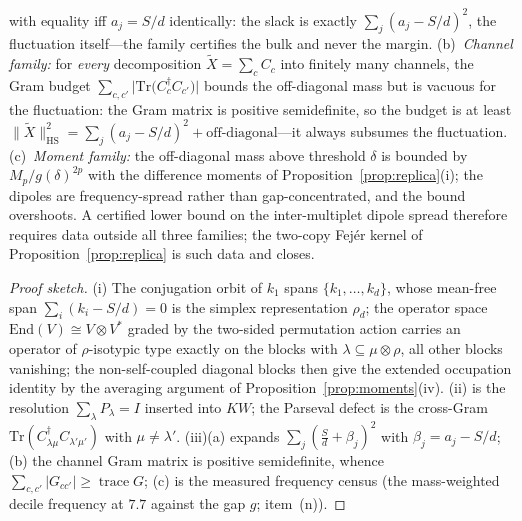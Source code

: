 \begin{proposition}
\begin{enumerate}[leftmargin=1.6em]
with equality iff $a_j=S/d$ identically: the slack is exactly
$\sum_j(a_j-S/d)^{2}$, the fluctuation itself---the family certifies the
bulk and never the margin. (b)~\emph{Channel family:} for
\emph{every} decomposition $\widetilde X=\sum_cC_c$ into finitely many
channels, the Gram budget $\sum_{c,c'}\bigl|
\mathrm{Tr}\bigl(C_c^{\dagger}C_{c'}\bigr)\bigr|$ bounds the off-diagonal
mass but is vacuous for the fluctuation: the Gram matrix is positive
semidefinite, so the budget is at least
$\|\widetilde X\|_{\mathrm{HS}}^{2}
=\sum_j(a_j-S/d)^{2}+\text{off-diagonal}$---it always subsumes the
fluctuation. (c)~\emph{Moment family:} the off-diagonal mass above
threshold $\delta$ is bounded by $M_p/g(\delta)^{2p}$ with the difference
moments of Proposition~\ref{prop:replica}(i); the dipoles are
frequency-spread rather than gap-concentrated, and the bound overshoots.
A certified lower bound on the inter-multiplet dipole spread therefore
requires data outside all three families; the two-copy Fej\'er kernel of
Proposition~\ref{prop:replica} is such data and closes.
\end{enumerate}
\end{proposition}

\begin{proof}[Proof sketch]
(i) The conjugation orbit of $k_1$ spans $\{k_1,\dots,k_d\}$, whose
mean-free span $\sum_i(k_i-S/d)=0$ is the simplex representation
$\rho_d$; the operator space $\mathrm{End}(V)\cong V\otimes V^{*}$ graded
by the two-sided permutation action carries an operator of
$\rho$-isotypic type exactly on the blocks with
$\lambda\subseteq\mu\otimes\rho$, all other blocks vanishing; the
non-self-coupled diagonal blocks then give the extended occupation
identity by the averaging argument of Proposition~\ref{prop:moments}(iv).
(ii) is the resolution $\sum_{\lambda}P_{\lambda}=I$ inserted into
$KW$; the Parseval defect is the cross-Gram
$\mathrm{Tr}(C_{\lambda\mu}^{\dagger}C_{\lambda'\mu'})$ with
$\mu\neq\lambda'$. (iii)(a) expands $\sum_j(\tfrac{S}{d}+\beta_j)^{2}$
with $\beta_j=a_j-S/d$; (b) the channel Gram matrix is positive
semidefinite, whence $\sum_{c,c'}|G_{cc'}|\ge\operatorname{trace}G$;
(c) is the measured frequency census (the mass-weighted decile
frequency at $7.7$ against the gap $g$; item~(n)).
\end{proof}

